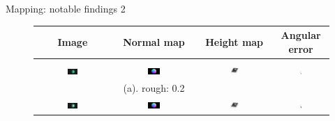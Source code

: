 \documentclass[10pt]{beamer}
\begin{document}
\begin{frame}{Mapping: notable findings 2}

\begin{figure}[!htbp]
\centering
\begin{tabular}{c|ccc}
  Image & Normal map & Height map & Angular error\\
  \hline\\
  \includegraphics[width=0.15\textwidth]{mapping/ps_spec_rough/0802_0001}&
  \includegraphics[width=0.15\textwidth]{mapping/ps_spec_rough/0802_normal}&
  \includegraphics[width=0.15\textwidth]{images/0802_dmap}&
  \includegraphics[width=0.03\textwidth]{mapping/ps_spec_rough/0802_ang_error}\\
  & (a). rough: 0.2\\
  \includegraphics[width=0.15\textwidth]{mapping/ps_spec_rough/0805_0001}&
  \includegraphics[width=0.15\textwidth]{mapping/ps_spec_rough/0805_normal}&
  \includegraphics[width=0.15\textwidth]{images/0805_dmap}&
  \includegraphics[width=0.03\textwidth]{mapping/ps_spec_rough/0805_ang_error}\\

\end{tabular}
\end{figure}
\end{frame}
\end{document}
